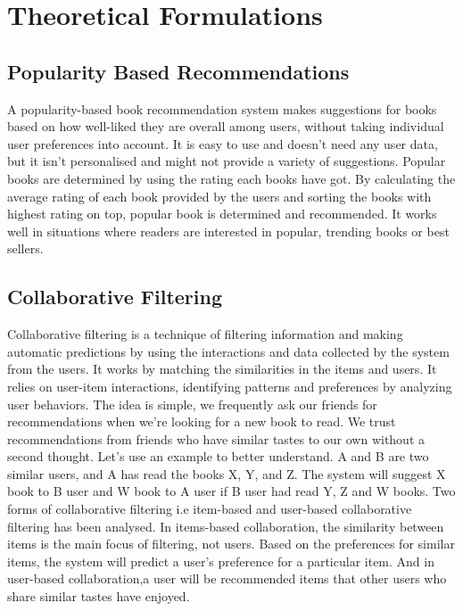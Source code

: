 \newpage
\section{Theoretical Formulations}

\subsection{Popularity Based Recommendations}
A popularity-based book recommendation system makes suggestions for books based on how well-liked they are overall among users, without taking individual user preferences into account. It is easy to use and doesn't need any user data, but it isn't personalised and might not provide a variety of suggestions. Popular books are determined by using the rating each books have got. By calculating the average rating of each book provided by the users and sorting the books with highest rating on top, popular book is determined and recommended. It works well in situations where readers are interested in popular, trending books or best sellers.

\subsection{Collaborative Filtering}
Collaborative filtering is a technique of filtering information and making automatic predictions by using the interactions and data collected by the system from the users. It works by matching the similarities in the items and users. It relies on user-item interactions, identifying patterns and preferences by analyzing user behaviors. The idea is simple, we frequently ask our friends for recommendations when we're looking for a new book to read. We trust recommendations from friends who have similar tastes to our own without a second thought. Let's use an example to better understand. A and B are two similar users, and A has read the books X, Y, and Z. The system will suggest X book to B user and W book to A user if B user had read Y, Z and W books. Two forms of collaborative filtering i.e item-based and user-based collaborative filtering has been analysed. In items-based collaboration, the similarity between items is the main focus of filtering, not users. Based on the preferences for similar items, the system will predict a user's preference for a particular item. And in user-based collaboration,a user will be recommended items that other users who share similar tastes have enjoyed.

